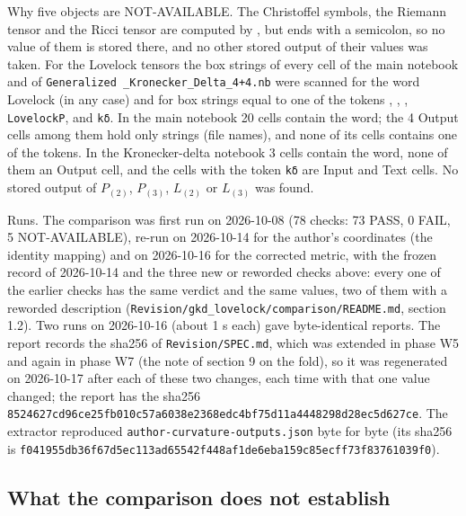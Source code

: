 \documentclass[11pt]{article}
\begin{document}
Why five objects are NOT-AVAILABLE. The Christoffel symbols, the Riemann tensor and the Ricci tensor are computed by \texttt{}, but \texttt{} ends with a semicolon, so no value of them is stored there, and no other stored output of their values was taken. For the Lovelock tensors the box strings of every cell of the main notebook and of \texttt{Generali\allowbreak{}zed \_Kro\allowbreak{}necker\_D\allowbreak{}elta\_4+4\allowbreak{}.nb} were scanned for the word Lovelock (in any case) and for box strings equal to one of the tokens \texttt{}, \texttt{}, \texttt{}, \texttt{Lovelock\allowbreak{}P}, \texttt{} and \texttt{kδ}. In the main notebook 20 cells contain the word; the 4 Output cells among them hold only strings (file names), and none of its cells contains one of the tokens. In the Kronecker-delta notebook 3 cells contain the word, none of them an Output cell, and the cells with the token \texttt{kδ} are Input and Text cells. No stored output of $P_{(2)}$, $P_{(3)}$, $L_{(2)}$ or $L_{(3)}$ was found.

Runs. The comparison was first run on 2026-10-08 (78 checks: 73 PASS, 0 FAIL, 5 NOT-AVAILABLE), re-run on 2026-10-14 for the author's coordinates (the identity mapping) and on 2026-10-16 for the corrected metric, with the frozen record of 2026-10-14 and the three new or reworded checks above: every one of the earlier checks has the same verdict and the same values, two of them with a reworded description (\texttt{Revision\allowbreak{}/gkd\_lov\allowbreak{}elock/co\allowbreak{}mparison\allowbreak{}/README.\allowbreak{}md}, section 1.2). Two runs on 2026-10-16 (about 1 s each) gave byte-identical reports. The report records the sha256 of \texttt{Revision\allowbreak{}/SPEC.md}, which was extended in phase W5 and again in phase W7 (the note of section 9 on the fold), so it was regenerated on 2026-10-17 after each of these two changes, each time with that one value changed; the report has the sha256 \texttt{8524627c\allowbreak{}d96ce25f\allowbreak{}b010c57a\allowbreak{}6038e236\allowbreak{}8edc4bf7\allowbreak{}5d11a444\allowbreak{}8298d28e\allowbreak{}c5d627ce}. The extractor reproduced \texttt{author-c\allowbreak{}urvature\allowbreak{}-outputs\allowbreak{}.json} byte for byte (its sha256 is \texttt{f041955d\allowbreak{}b36f67d5\allowbreak{}ec113ad6\allowbreak{}5542f448\allowbreak{}af1de6eb\allowbreak{}a159c85e\allowbreak{}cff73f83\allowbreak{}761039f0}).

\subsection{What the comparison does not establish}
\end{document}

